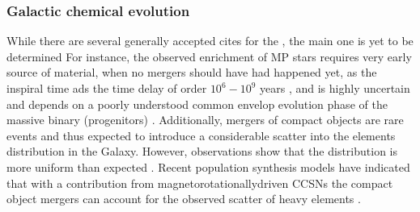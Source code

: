 \subsubsection{Galactic chemical evolution}

While there are several generally accepted cites for the \rproc{}, the main one is yet to be 
determined \citep[\eg][]{Qian:2000bh,Argast:2003he,Matteucci:2014}
%
For instance, the observed \rproc{} enrichment of \ac{MP} stars 
requires very early source of \rproc{} material, when no mergers 
should have had happened yet, as the inspiral time ads the time delay of order 
$10^{6} - 10^{9}$ years \citep{DeDonder:2004cx,Dominik:2012kk}, and is highly uncertain and 
depends on a poorly understood common envelop evolution phase of the massive binary (progenitors)
\citep[\eg]{Dominik:2012kk}. 
Additionally, mergers of compact objects are rare events and thus expected to introduce 
a considerable scatter into the \rproc{} elements distribution in the Galaxy. 
However, observations show that the distribution is more uniform than expected \citep{Argast:2003he}.
Recent population synthesis models have indicated that with a contribution from 
magnetorotationallydriven \acp{CCSN} the compact object mergers can account for the 
observed scatter of heavy elements \citep{Ishimaru:2015,Cescutti:2015,Wehmeyer:2015,VanDeVoort:2015}.
%
